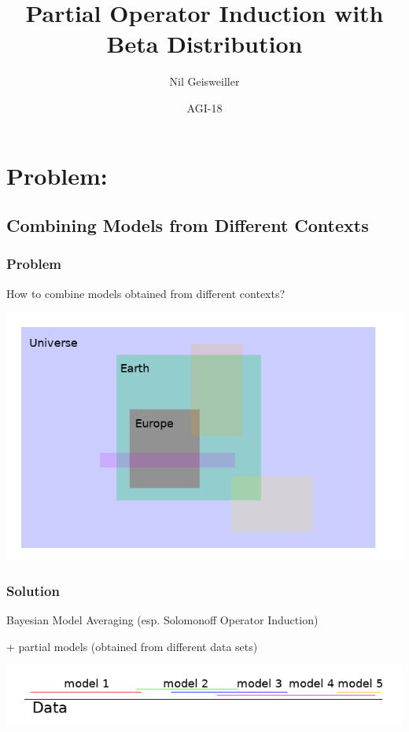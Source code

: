 \documentclass{beamer}
\title{Partial Operator Induction with Beta Distribution}
\author{Nil Geisweiller}
\institute[SingularityNET OpenCog Foundations] %
{
  SingularityNET\\
  OpenCog Foundations
}
\date[AGI-18] %
{AGI-18}
\begin{document}
\frame
{
  \maketitle
}
\section[Outline]{}
\frame{\tableofcontents}

\section{Problem:}
\subsection{Combining Models from Different Contexts}

\begin{frame}[fragile]
  \frametitle{Problem}

  How to combine models obtained from different contexts?

  \includegraphics[scale=0.5]{images/Europe_Earth_Universe.png}
\end{frame}


\begin{frame}[fragile]
  \frametitle{Solution}

  Bayesian Model Averaging (esp. Solomonoff Operator Induction)

  + partial models (obtained from different data sets)

  \includegraphics[scale=0.5]{images/data_line.png}
\end{frame}
\end{document}

